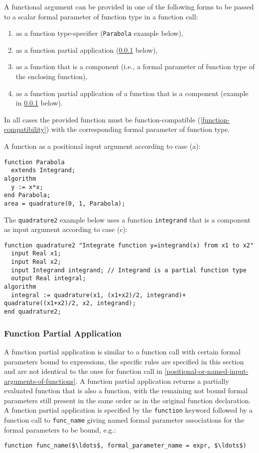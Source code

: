 A functional argument can be provided in one of the following forms to
be passed to a scalar formal parameter of function type in a function
call:
\begin{enumerate}
\def\labelenumi{\alph{enumi})}
\item
  as a function type-specifier (\lstinline!Parabola! example below),
\item
  as a function partial application (\cref{function-partial-application} below),
\item
  as a function that is a component (i.e., a formal parameter of function type of the enclosing function),
\item
  as a function partial application of a function that is a component
  (example in \cref{function-partial-application} below).
\end{enumerate}

In all cases the provided function must be function-compatible (\cref{function-compatibility}) with the corresponding formal parameter of function type.

\begin{example}
A function as a positional input argument according to case (a):
\begin{lstlisting}[language=modelica]
function Parabola
  extends Integrand;
algorithm
  y := x*x;
end Parabola;
area = quadrature(0, 1, Parabola);
\end{lstlisting}
The \lstinline!quadrature2! example below uses a function \lstinline!integrand! that is a
component as input argument according to case (c):
\begin{lstlisting}[language=modelica]
function quadrature2 "Integrate function y=integrand(x) from x1 to x2"
  input Real x1;
  input Real x2;
  input Integrand integrand; // Integrand is a partial function type
  output Real integral;
algorithm
  integral := quadrature(x1, (x1+x2)/2, integrand)+  quadrature((x1+x2)/2, x2, integrand);
end quadrature2;
\end{lstlisting}
\end{example}

\subsubsection{Function Partial Application}\label{function-partial-application}

A function partial application is similar to a function call with
certain formal parameters bound to expressions, the specific rules are
specified in this section and are not identical to the ones for function
call in \cref{positional-or-named-input-arguments-of-functions}. A function partial application returns a partially
evaluated function that is also a function, with the remaining not bound
formal parameters still present in the same order as in the original
function declaration. A function partial application is specified by the
\lstinline!function! keyword followed by a function call to \lstinline!func_name!
giving named formal parameter associations for the formal parameters to
be bound, e.g.:
\begin{lstlisting}[language=modelica]
function func_name($\ldots$, formal_parameter_name = expr, $\ldots$)
\end{lstlisting}

